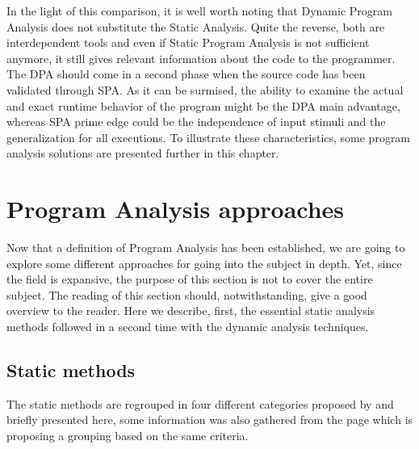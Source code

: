 \bigskip

In the light of this comparison, it is well worth noting that Dynamic Program Analysis does not substitute the Static Analysis. Quite the reverse, both are interdependent tools and even if Static Program Analysis is not sufficient anymore, it still gives relevant information about the code to the programmer. The DPA should come in a second phase when the source code has been validated through SPA. As it can be surmised, the ability to examine the actual and exact runtime behavior of the program might be the DPA main advantage, whereas SPA prime edge could be the independence of input stimuli and the generalization for all executions. To illustrate these characteristics, some program analysis solutions are presented further in this chapter.

\pagebreak

\section{Program Analysis approaches}
Now that a definition of Program Analysis has been established, we are going to explore some different approaches for going into the subject in depth. Yet, since the field is expansive, the purpose of this section is not to cover the entire subject. The reading of this section should, notwithstanding, give a good overview to the reader. Here we describe, first, the essential static analysis methods followed in a second time with the dynamic analysis techniques.

\subsection{Static methods}

The static methods are regrouped in four different categories proposed by \cite{Nielson2004} and briefly presented here, some information was also gathered from the \cite{Wikipedi2016} page which is proposing a grouping based on the same criteria.

